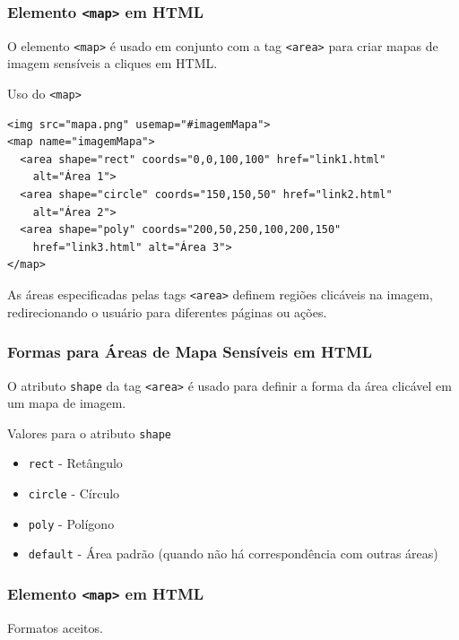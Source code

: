 \documentclass{beamer}
\begin{document}
\begin{frame}[fragile]
  \frametitle{Elemento \texttt{<map>} em HTML}

  O elemento \texttt{<map>} é usado em conjunto com a tag \texttt{<area>} para criar mapas de imagem sensíveis a cliques em HTML.

  \begin{block}{Uso do \texttt{<map>}}
    \begin{verbatim}
<img src="mapa.png" usemap="#imagemMapa">
<map name="imagemMapa">
  <area shape="rect" coords="0,0,100,100" href="link1.html"
    alt="Área 1">
  <area shape="circle" coords="150,150,50" href="link2.html"
    alt="Área 2">
  <area shape="poly" coords="200,50,250,100,200,150" 
    href="link3.html" alt="Área 3">
</map>
    \end{verbatim}
  \end{block}

  As áreas especificadas pelas tags \texttt{<area>} definem regiões clicáveis na imagem, redirecionando o usuário para diferentes páginas ou ações.

\end{frame}

\begin{frame}[fragile]
  \frametitle{Formas para Áreas de Mapa Sensíveis em HTML}

  O atributo \texttt{shape} da tag \texttt{<area>} é usado para definir a forma da área clicável em um mapa de imagem.

  \begin{block}{Valores para o atributo \texttt{shape}}
    \begin{itemize}
      \item \texttt{rect} - Retângulo
      \item \texttt{circle} - Círculo
      \item \texttt{poly} - Polígono
      \item \texttt{default} - Área padrão (quando não há correspondência com outras áreas)
    \end{itemize}
  \end{block}


\end{frame}


\begin{frame}
  \frametitle{Elemento \texttt{<map>} em HTML}

Formatos aceitos.

  \begin{center}
  \end{center}
\end{frame}
\end{document}
